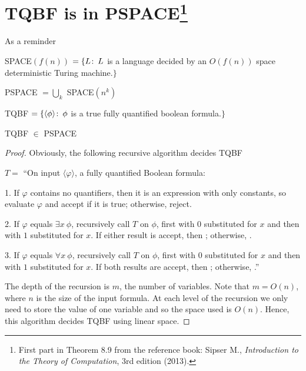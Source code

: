 \section{\texorpdfstring{TQBF is in PSPACE\footnote{%
First part in Theorem 8.9 from the reference book: Sipser M.,
\emph{Introduction to the Theory of Computation}, 3rd edition
(2013).}}{TQBF is in PSPACE}}

As a reminder
\begin{definition}
	SPACE\((f(n))\) \(= \{L \colon\, L \) is a language decided by an \(O(f(n))\) space
	deterministic Turing machine.\(\}\)
\end{definition}
\begin{definition}
	PSPACE \(= \bigcup_k\) SPACE\((n^k)\)
\end{definition}
\begin{definition}
	TQBF \(= \{ \langle \phi \rangle \colon\, \phi\) is a true fully quantified
	boolean formula.\(\}\)
\end{definition}

\begin{theorem}
	TQBF \(\in\) PSPACE
\end{theorem}

\begin{proof}
Obviously, the following recursive algorithm decides TQBF
\begin{TMachine}{\(T =\) ``On input \(\langle \varphi \rangle\), a fully quantified Boolean formula:}
\item[1.] If \(\varphi\) contains no quantifiers, then it is an expression with only
constants, so evaluate \(\varphi\) and accept if it is true; otherwise, reject.
\item[2.] If \(\varphi\) equals \(\exists x~\phi\), recursively call \(T\) on
	\(\phi\), first with \(0\) substituted
	for \(x\) and then with \(1\) substituted for \(x\). If either result is accept,
then \accept; otherwise, \reject.
\item[3.] If \(\varphi\) equals \(\forall x~\phi\), recursively call \(T\) on
	\(\phi\), first with \(0\) substituted
	for \(x\) and then with \(1\) substituted for \(x\). If both results are
	accept, then \accept; otherwise, \reject.''
\end{TMachine}

The depth of the recursion is \(m\), the number of variables.
Note that \(m = O(n)\), where \(n\) is the size of the input formula.
At each level of
the recursion we only need to store the value of one variable and so the space
used is \(O(n)\). Hence, this algorithm decides TQBF using linear space.

\end{proof}
